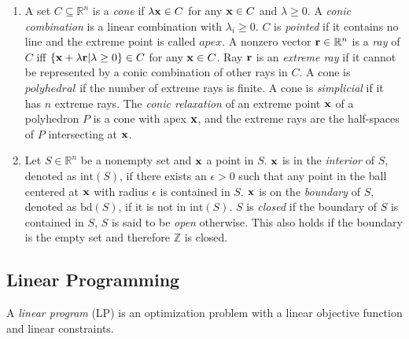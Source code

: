 \begin{enumerate}
    \item A set $C \subseteq \mathbb{R}^n$ is a \textit{cone} if $\lambda \bold x \in C$ for any $\bold x \in C$ and $\lambda \geq 0$. A \textit{conic combination} is a linear combination with $\lambda_i \geq 0$. %
    $C$ is \textit{pointed} if it contains no line and the extreme point is called $apex$. A nonzero vector $\bold r \in \mathbb{R}^n$ is a \textit{ray} of $C$ iff $\{\bold x + \lambda \bold r | \lambda \geq 0 \} \in C$ for any $\bold x \in C$. Ray $\bold r$ is an \textit{extreme ray} if it cannot be represented by a conic combination of other rays in $C$. 
    A cone is $polyhedral$ if the number of extreme rays is finite. A cone is \textit{simplicial} if it has $n$ extreme rays. 
    The \textit{conic relaxation} of an extreme point $\bold x$ of a polyhedron $P$ is a cone with apex $\bold x$, and the extreme rays are the half-spaces of $P$ intersecting at $\bold x$.
    
    \item Let $S \in \mathbb{R}^n$ be a nonempty set and $\bold x$ a point in $S$. $\bold x$ is in the \textit{interior} of $S$, denoted as $\text{int}(S)$, if there exists an $\epsilon > 0$ such that any point in the ball centered at $\bold x$ with radius $\epsilon$ is contained in $S$. $\bold x$ is on the \textit{boundary} of $S$, denoted as $\text{bd}(S)$, if it is not in $\text{int}(S)$. $S$ is \textit{closed} if the boundary of $S$ is contained in $S$, $S$ is said to be \textit{open} otherwise. %
    This also holds if the boundary is the empty set and therefore $\mathbb{Z}$ is closed.
\end{enumerate}

\subsection{Linear Programming} \label{section:Linear Programming}
A \textit{linear program} (LP) is an optimization problem with a linear objective function and linear constraints.

